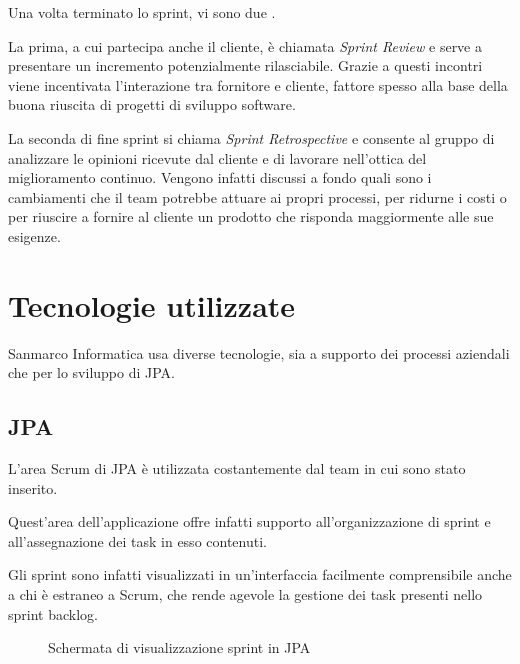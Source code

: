 Una volta terminato lo sprint, vi sono due .

La prima, a cui partecipa anche il cliente, è chiamata \emph{Sprint Review} e
serve a presentare un incremento potenzialmente rilasciabile. Grazie
a questi incontri viene incentivata l'interazione tra fornitore e cliente,
fattore spesso alla base della buona riuscita di progetti di sviluppo software.

La seconda  di fine sprint si chiama \emph{Sprint
Retrospective} e consente al gruppo di analizzare le opinioni ricevute dal
cliente e di lavorare nell'ottica del miglioramento continuo. Vengono infatti
discussi a fondo quali sono i cambiamenti che il team potrebbe attuare ai
propri processi, per ridurne i costi o per riuscire a fornire al cliente un
prodotto che risponda maggiormente alle sue esigenze.
\section{Tecnologie utilizzate}\label{sec:azienda-tecnologie}

Sanmarco Informatica usa diverse tecnologie, sia a supporto dei processi
aziendali che per lo sviluppo di JPA.

\subsection{JPA}

L'area Scrum di JPA è utilizzata costantemente dal team in cui sono stato
inserito.

Quest'area dell'applicazione offre infatti supporto all'organizzazione di
sprint e all'assegnazione dei task in esso contenuti.

Gli sprint sono infatti visualizzati in un'interfaccia facilmente comprensibile
anche a chi è estraneo a Scrum, che rende agevole la gestione dei task presenti
nello sprint backlog.

\begin{figure}%
  \noindent{}%
  \caption{Schermata di visualizzazione sprint in JPA}%
  \label{fig:jpa-viewer}%
\end{figure}

